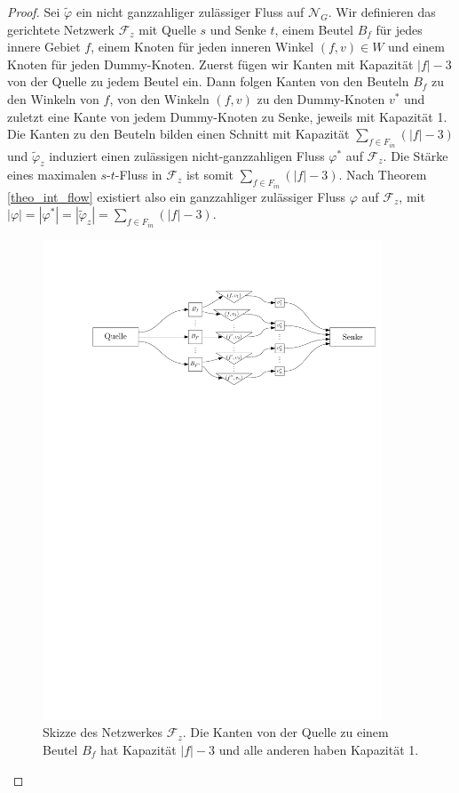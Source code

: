 \begin{proof}
Sei $\tilde{\varphi}$ ein nicht ganzzahliger zulässiger Fluss auf $\mathcal{N}_G$. Wir definieren das gerichtete Netzwerk $\mathcal{F}_z$ mit Quelle $s$ und Senke $t$, einem Beutel $B_f$ für jedes innere Gebiet $f$, einem Knoten für jeden inneren Winkel $(f,v) \in W$ und einem Knoten für jeden Dummy-Knoten. Zuerst fügen wir Kanten mit Kapazität $|f|-3$ von der Quelle zu jedem Beutel ein. Dann folgen Kanten von den Beuteln $B_f$ zu den Winkeln von $f$, von den Winkeln $(f,v)$ zu den Dummy-Knoten $v^*$ und zuletzt eine Kante von jedem Dummy-Knoten zu Senke, jeweils mit Kapazität 1. Die Kanten zu den Beuteln bilden einen Schnitt mit Kapazität $\sum_{f \in F_{in}}(|f|-3)$ und $\tilde{\varphi}_z$ induziert einen zulässigen nicht-ganzzahligen Fluss $\varphi^*$ auf $\mathcal{F}_z$. Die Stärke eines maximalen $s$-$t$-Fluss in $\mathcal{F}_z$ ist somit $\sum_{f \in F_{in}}(|f|-3)$. Nach Theorem \ref{theo_int_flow} existiert also ein ganzzahliger zulässiger Fluss $\varphi$ auf $\mathcal{F}_z$, mit $|\varphi| = |\varphi^*| = |\tilde{\varphi}_z| = \sum_{f \in F_{in}}(|f|-3).$

\begin{figure}
	\centering
  	\includegraphics[width=0.9\textwidth]{lem_faa_choice.pdf}
  	\caption{Skizze des Netzwerkes $\mathcal{F}_z$. Die Kanten von der Quelle zu einem Beutel $B_f$ hat Kapazität $|f|-3$ und alle anderen haben Kapazität 1.}
	\label{pic_faa_choice}
\end{figure}


\end{proof}
